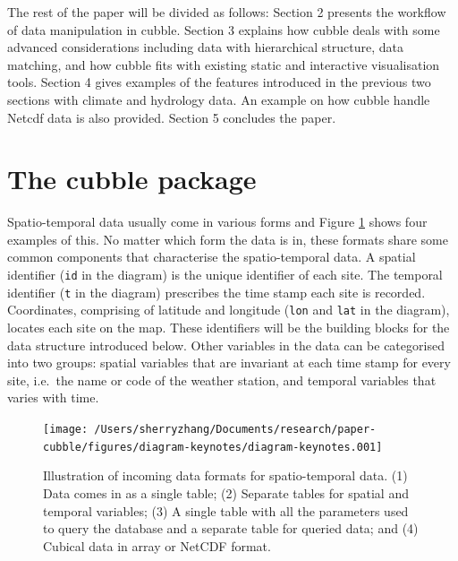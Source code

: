 \documentclass[
]{jss}
\begin{document}
The rest of the paper will be divided as follows: Section 2 presents the
workflow of data manipulation in cubble. Section 3 explains how cubble
deals with some advanced considerations including data with hierarchical
structure, data matching, and how cubble fits with existing static and
interactive visualisation tools. Section 4 gives examples of the
features introduced in the previous two sections with climate and
hydrology data. An example on how cubble handle Netcdf data is also
provided. Section 5 concludes the paper.

\newpage

\hypertarget{the-cubble-package}{%
\section{The cubble package}\label{the-cubble-package}}

Spatio-temporal data usually come in various forms and Figure
\ref{fig:illu-input} shows four examples of this. No matter which form
the data is in, these formats share some common components that
characterise the spatio-temporal data. A spatial identifier (\texttt{id}
in the diagram) is the unique identifier of each site. The temporal
identifier (\texttt{t} in the diagram) prescribes the time stamp each
site is recorded. Coordinates, comprising of latitude and longitude
(\texttt{lon} and \texttt{lat} in the diagram), locates each site on the
map. These identifiers will be the building blocks for the data
structure introduced below. Other variables in the data can be
categorised into two groups: spatial variables that are invariant at
each time stamp for every site, i.e.~the name or code of the weather
station, and temporal variables that varies with time.

\begin{CodeChunk}
\begin{figure}

{\centering \texttt{[image: /Users/sherryzhang/Documents/research/paper-cubble/figures/diagram-keynotes/diagram-keynotes.001]} 

}

\caption[Illustration of incoming data formats for spatio-temporal data]{Illustration of incoming data formats for spatio-temporal data. (1) Data comes in as a single table; (2) Separate tables for spatial and temporal variables; (3) A single table with all the parameters used to query the database and a separate table for queried data; and (4) Cubical data in array or NetCDF format.}\label{fig:illu-input}
\end{figure}
\end{CodeChunk}
\end{document}
